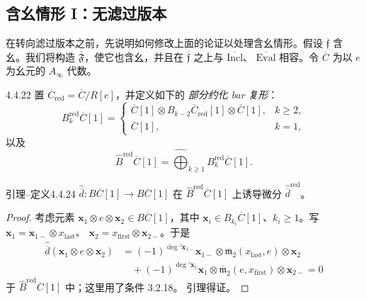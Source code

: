 
\subsection{含幺情形 I：无滤过版本}
\label{subsec:4-4-4}

在转向滤过版本之前，先说明如何修改上面的论证以处理含幺情形。假设
$\overline{\mathfrak f}$ 含幺。我们将构造
$\overline{\mathfrak F}$，使它也含幺，并且在
$\overline{\mathfrak f}$ 之上与 $\overline{\mathrm{Incl}}$、
$\overline{\mathrm{Eval}}$ 相容。令 $\overline C$ 为以 $e$ 为幺元的
$A_\infty$ 代数。

\begin{definition}{4.4.22}\label{def:4-4-22}
置 $\overline C_{\mathrm{red}}=\overline C/R[e]$，并定义如下的
\emph{部分约化 bar 复形}：
\begin{equation}
 B_k^{\mathrm{red}}\overline C[1]
 =
 \begin{cases}
  \overline C[1]\otimes
  B_{k-2}\overline C_{\mathrm{red}}[1]\otimes\overline C[1],
  &k\geq2,\\
  \overline C[1],&k=1,
 \end{cases}
\tag{4.4.23}\label{eq:4-4-23}
\end{equation}
以及
\[
 \widehat B^{\mathrm{red}}\overline C[1]
 =\widehat{\bigoplus}_{k\geq1}
 B_k^{\mathrm{red}}\overline C[1].
\]
\end{definition}

\begin{statement}{引理--定义}{4.4.24}\label{lem-def:4-4-24}
$\widehat{\overline d}\colon
B\overline C[1]\to B\overline C[1]$ 在
$\widehat B^{\mathrm{red}}\overline C[1]$ 上诱导微分
$\widehat{\overline d}^{\mathrm{red}}$。
\end{statement}

\begin{proof}
考虑元素
$\mathbf x_1\otimes e\otimes\mathbf x_2\in B\overline C[1]$，其中
$\mathbf x_i\in B_{k_i}\overline C[1]$、$k_i\geq1$。写
$\mathbf x_1=\mathbf x_{1-}\otimes x_{\mathrm{last}}$、
$\mathbf x_2=x_{\mathrm{first}}\otimes\mathbf x_{2-}$。于是
\[
 \begin{aligned}
 \widehat{\overline d}
 (\mathbf x_1\otimes e\otimes\mathbf x_2)
 &={}
 (-1)^{\deg'\mathbf x_{1-}}
 \mathbf x_{1-}\otimes
 \overline{\mathfrak m}_2(x_{\mathrm{last}},e)
 \otimes\mathbf x_2\\
 &\quad{}+
 (-1)^{\deg'\mathbf x_1}
 \mathbf x_1\otimes
 \overline{\mathfrak m}_2(e,x_{\mathrm{first}})
 \otimes\mathbf x_{2-}=0
 \end{aligned}
\]
于 $\widehat B^{\mathrm{red}}\overline C[1]$ 中；这里用了条件 3.2.18。
引理得证。
\end{proof}

